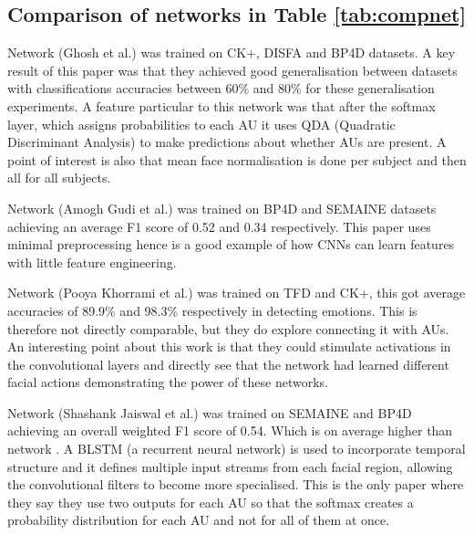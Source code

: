     \subsection*{Comparison of networks in Table \ref{tab:compnet}}
    Network \cite{Ghosh2015} (Ghosh et al.) was trained on CK+, DISFA and BP4D datasets.
    A key result of this paper was that they achieved good generalisation between datasets
    with classifications accuracies between 60\% and 80\% for these generalisation experiments.
    A feature particular to this network was that after the softmax layer, which assigns probabilities
    to each AU it uses QDA (Quadratic Discriminant Analysis\cite{precogbook})  to
    make predictions about whether AUs are present. A point of interest is also that
    mean face normalisation is done per subject and then all for all subjects.

    Network \cite{Gudi2015} (Amogh Gudi et al.) was trained on BP4D and SEMAINE
    datasets achieving an average F1 score of 0.52 and 0.34 respectively. This paper
    uses minimal preprocessing hence is a good example of how CNNs can learn features
    with little feature engineering.

    Network \cite{Khorrami2015} (Pooya Khorrami et al.) was trained on TFD and CK+,
    this got average accuracies of 89.9\% and 98.3\% respectively in detecting emotions. This
    is therefore not directly comparable, but they do explore connecting it with AUs.
    An interesting point about this work is that they could stimulate activations in the convolutional
    layers and directly see that the network had learned different facial actions demonstrating the
    power of these networks.

    Network \cite{Jaiswal2016} (Shashank Jaiswal et al.) was trained on SEMAINE and
    BP4D achieving an overall weighted F1 score of 0.54. Which is on average higher
    than network \cite{Gudi2015}. A BLSTM (a recurrent neural network) is used to incorporate temporal structure
    and it defines multiple input streams from each facial region, allowing the convolutional
    filters to become more specialised. This is the only paper where they say they use
    two outputs for each AU so that the softmax creates a probability distribution for
    each AU and not for all of them at once.


